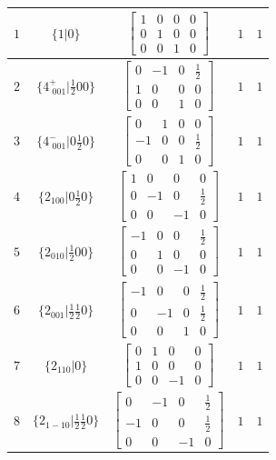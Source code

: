 \documentclass[fleqn,8pt]{jsarticle}
\begin{document}
\begin{longtable}{ccccc}
$ 1 $ & $ \{1|0\} $ & $ \begin{bmatrix} 1 & 0 & 0 & 0 \\ 0 & 1 & 0 & 0 \\ 0 & 0 & 1 & 0 \end{bmatrix} $ & $ 1 $ & $ 1 $ \\ \hline
$ 2 $ & $ \{4^{+}_{\,\,001}|\frac{1}{2} 0 0\} $ & $ \begin{bmatrix} 0 & -1 & 0 & \frac{1}{2} \\ 1 & 0 & 0 & 0 \\ 0 & 0 & 1 & 0 \end{bmatrix} $ & $ 1 $ & $ 1 $ \\ \hline
$ 3 $ & $ \{4^{-}_{\,\,001}|0 \frac{1}{2} 0\} $ & $ \begin{bmatrix} 0 & 1 & 0 & 0 \\ -1 & 0 & 0 & \frac{1}{2} \\ 0 & 0 & 1 & 0 \end{bmatrix} $ & $ 1 $ & $ 1 $ \\ \hline
$ 4 $ & $ \{2{}_{100}|0 \frac{1}{2} 0\} $ & $ \begin{bmatrix} 1 & 0 & 0 & 0 \\ 0 & -1 & 0 & \frac{1}{2} \\ 0 & 0 & -1 & 0 \end{bmatrix} $ & $ 1 $ & $ 1 $ \\ \hline
$ 5 $ & $ \{2{}_{010}|\frac{1}{2} 0 0\} $ & $ \begin{bmatrix} -1 & 0 & 0 & \frac{1}{2} \\ 0 & 1 & 0 & 0 \\ 0 & 0 & -1 & 0 \end{bmatrix} $ & $ 1 $ & $ 1 $ \\ \hline
$ 6 $ & $ \{2{}_{001}|\frac{1}{2} \frac{1}{2} 0\} $ & $ \begin{bmatrix} -1 & 0 & 0 & \frac{1}{2} \\ 0 & -1 & 0 & \frac{1}{2} \\ 0 & 0 & 1 & 0 \end{bmatrix} $ & $ 1 $ & $ 1 $ \\ \hline
$ 7 $ & $ \{2{}_{110}|0\} $ & $ \begin{bmatrix} 0 & 1 & 0 & 0 \\ 1 & 0 & 0 & 0 \\ 0 & 0 & -1 & 0 \end{bmatrix} $ & $ 1 $ & $ 1 $ \\ \hline
$ 8 $ & $ \{2{}_{1-10}|\frac{1}{2} \frac{1}{2} 0\} $ & $ \begin{bmatrix} 0 & -1 & 0 & \frac{1}{2} \\ -1 & 0 & 0 & \frac{1}{2} \\ 0 & 0 & -1 & 0 \end{bmatrix} $ & $ 1 $ & $ 1 $ \\ \hline

\end{longtable}
\end{document}
